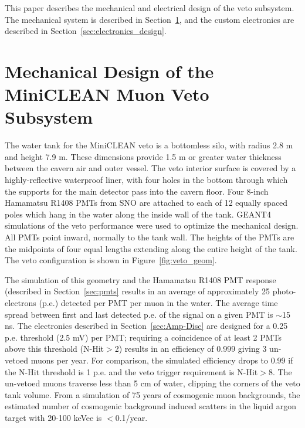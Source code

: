 \documentclass{JINST}
\begin{document}
This paper describes the mechanical and electrical design of the veto
subsystem.  The mechanical system is described in
Section~\ref{sec:subsystem_design}, and the custom electronics are
described in Section~\ref{sec:electronics_design}.


\section{Mechanical Design of the MiniCLEAN Muon Veto Subsystem}
\label{sec:subsystem_design}
%
The water tank for the MiniCLEAN veto is a bottomless silo, with
radius 2.8 m and height 7.9 m. These dimensions provide 1.5 m or
greater water thickness between the cavern air and outer vessel. The
veto interior surface is covered by a highly-reflective waterproof liner, with four
holes in the bottom through which the supports for the main detector
pass into the cavern floor. Four 8-inch Hamamatsu R1408 PMTs from SNO are
attached to each of 12 equally spaced poles which hang in the water
along the inside wall of the tank. GEANT4~\cite{ref:geant4} simulations
of the veto performance were used to optimize the mechanical
design. All PMTs point inward, normally to the tank wall. The heights
of the PMTs are the midpoints of four equal lengths extending along
the entire height of the tank. The veto configuration is shown in
Figure~\ref{fig:veto_geom}.  

The simulation of this geometry and the Hamamatsu R1408 PMT response (described
in Section~\ref{sec:pmts} results in an average of approximately 25
photo-electrons (p.e.) detected per PMT per muon in the water.  The
average time spread between first and last detected p.e. of the signal
on a given PMT is $\sim$15 ns.  The electronics described in
Section~\ref{sec:Amp-Disc} are designed for a 0.25 p.e. threshold (2.5
mV) per PMT; requiring a coincidence of at least 2 PMTs above this
threshold (N-Hit$>$2) results in an efficiency of 0.999 giving 3
un-vetoed muons per year.  For comparison, the simulated efficiency
drops to 0.99 if the N-Hit threshold is 1 p.e. and the veto trigger
requirement is N-Hit$>$8.  The un-vetoed muons traverse less than 5 cm
of water, clipping the corners of the veto tank volume.  From a
simulation of 75 years of cosmogenic muon backgrounds, the estimated
number of cosmogenic background induced scatters in the liquid argon
target with 20-100 keVee is $<$0.1/year.
\end{document}
